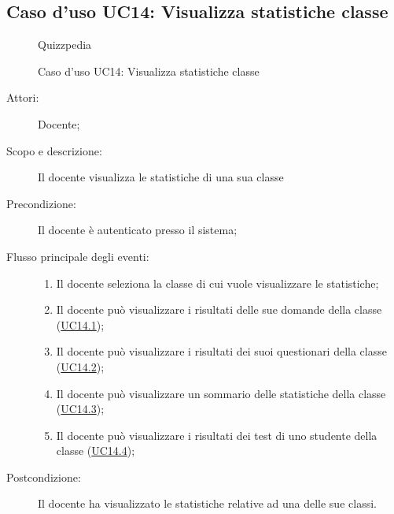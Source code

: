 \subsection{Caso d'uso UC14: Visualizza statistiche classe}
        \begin{figure}[H]
            \centering
            \begin{resizedtikzpicture}{\textwidth}
		\begin{umlsystem}[x=0, fill=lightgray!20]{Quizzpedia}
		\end{umlsystem}
            \end{resizedtikzpicture}
            \caption{Caso d'uso UC14: Visualizza statistiche classe}
            \label{fig:UC14} 
        \end{figure}
    \begin{description}
\item[Attori:] Docente;
\item[Scopo e descrizione:] Il docente visualizza le statistiche di una sua classe
      \item[Precondizione:] Il docente è autenticato presso il sistema;

        \item[Flusso principale degli eventi:] \begin{enumerate}
          \item Il docente seleziona la classe di cui vuole visualizzare le statistiche;
          \item Il docente può visualizzare i risultati delle sue domande della classe (\hyperlink{UC14.1}{UC14.1});
          \item Il docente può visualizzare i risultati dei suoi questionari della classe (\hyperlink{UC14.2}{UC14.2});
          \item Il docente può visualizzare un sommario delle statistiche della classe (\hyperlink{UC14.3}{UC14.3});
          \item Il docente può visualizzare i risultati dei test di uno studente della classe (\hyperlink{UC14.4}{UC14.4});

      \end{enumerate}
    \item[Postcondizione:] Il docente ha visualizzato le statistiche relative ad una delle sue classi.
  \end{description}
\hypertarget{UC14.1}{}
